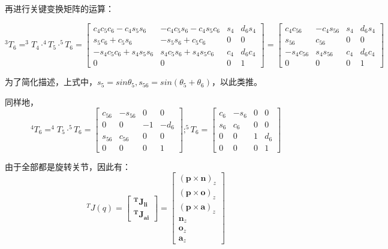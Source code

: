 \documentclass{ctexart}
\begin{document}
再进行关键变换矩阵的运算：

\begin{equation*}
	^3T_6=^3T_4 \cdot ^4T_5 \cdot ^5T_6 = \begin{bmatrix}
		c_4c_5c_6-c_4s_5s_6 & -c_4c_5s_6-c_4s_5c_6 & s_4 & d_6s_4 \\
		s_5c_6+c_5s_6 & -s_5s_6+c_5c_6 & 0 & 0 \\
		-s_4c_5c_6+s_4s_5s_6 & s_4c_5s_6+s_4s_5c_6 & c_4 & d_6c_4 \\
		0 & 0 & 0 & 1
	\end{bmatrix}
	=\begin{bmatrix}
		c_4c_{56} & -c_4s_{56} & s_4 & d_6s_4 \\
		s_{56} & c_{56} & 0 & 0 \\
		-s_4c_{56} & s_4s_{56} & c_4 & d_6c_4 \\
		0 & 0 & 0 & 1
	\end{bmatrix}
\end{equation*}

为了简化描述，上式中，$s_5 = sin \theta_5 ,s_{56} = sin (\theta_5+\theta_6)$，以此类推。

同样地，
\begin{equation}
	^4T_6=^4T_5 \cdot ^5T_6 = \begin{bmatrix}
		c_{56} & -s_{56} & 0 & 0 \\
		0 & 0 & -1 & -d_6 \\
		s_{56} & c_{56} & 0 & 0 \\
		0 & 0 & 0 & 1
	\end{bmatrix} ;
	^5T_6=\begin{bmatrix}
		c_6 & -s_6 & 0 & 0 \\
		s_6 & c_6 & 0 & 0 \\
		0 & 0 & 1 & d_6\\
		0 & 0 & 0 & 1
	\end{bmatrix}
\end{equation}

由于全部都是旋转关节，因此有：
\begin{equation}
	^TJ(q) = \begin{bmatrix}
		\boldsymbol{^TJ_{li}}\\
		\boldsymbol{^TJ_{ai}}
	\end{bmatrix}
	=\begin{bmatrix}
		(\boldsymbol{p}\times \boldsymbol{n})_z\\
		(\boldsymbol{p}\times \boldsymbol{o})_z\\
		(\boldsymbol{p}\times \boldsymbol{a})_z\\
		\boldsymbol{n}_z\\
		\boldsymbol{o}_z\\
		\boldsymbol{a}_z
	\end{bmatrix}
\end{equation}
\end{document}
